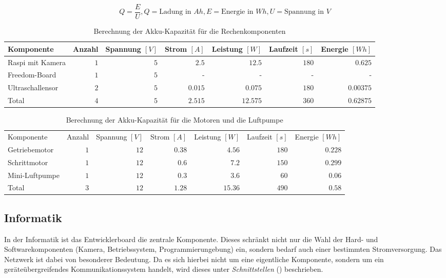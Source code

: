 \begin{equation}
Q=\frac{E}{U}, Q=\text{Ladung in }Ah, E=\text{Energie in }Wh, U=\text{Spannung in }V
\label{eq:akku}
\end{equation}

\begin{table}
\small
\begin{tabularx}{\linewidth}{l|r|r|r|r|r|r}
Komponente & Anzahl & Spannung $[V]$ & Strom $[A]$ & Leistung $[W]$ & Laufzeit $[s]$ & Energie $[Wh]$ \\
\hline
Raspi mit Kamera & $1$ & $5$ & $2.5$ & $12.5$ & $180$ & $0.625$ \\
\hline
Freedom-Board & $1$ & $5$ & - & - & - & - \\
\hline
Ultraschallensor & $2$ & $5$ & $0.015$ & $0.075$ & $180$ & $0.00375$ \\
\hline
Total & $4$ & $5$ & $2.515$ & $12.575$ & $360$ & $0.62875$ \\
\end{tabularx}
\caption{Berechnung der Akku-Kapazität für die Rechenkomponenten\label{tbl:akku1}}
\end{table}

\begin{table}
\small
\begin{tabularx}{\linewidth}{l|r|r|r|r|r|r}
Komponente & Anzahl & Spannung $[V]$ & Strom $[A]$ & Leistung $[W]$ & Laufzeit $[s]$ & Energie $[Wh]$ \\
Getriebemotor & $1$ & $12$ & $0.38$ & $4.56$ & $180$ & $0.228$ \\
\hline
Schrittmotor & $1$ & $12$ & $0.6$ & $7.2$ & $150$ & $0.299$ \\
\hline
Mini-Luftpumpe & $1$ & $12$ & $0.3$ & $3.6$ & $60$ & $0.06$ \\
\hline
Total & $3$ & $12$ & $1.28$ & $15.36$ & $490$ & $0.58$ \\
\end{tabularx}
\caption{Berechnung der Akku-Kapazität für die Motoren und die Luftpumpe\label{tbl:akku2}}
\end{table}

\subsection{Informatik}
\label{sec:komponenten-informatik}

In der Informatik ist das Entwicklerboard die zentrale Komponente. Dieses schränkt nicht nur die Wahl der Hard- und Softwarekomponenten (Kamera, Betriebssystem, Programmierungebung) ein, sondern bedarf auch einer bestimmten Stromversorgung. Das Netzwerk ist dabei von besonderer Bedeutung. Da es sich hierbei nicht um eine eigentliche Komponente, sondern um ein geräteübergreifendes Kommunikationssystem handelt, wird dieses unter \textit{Schnittstellen} () beschrieben.

